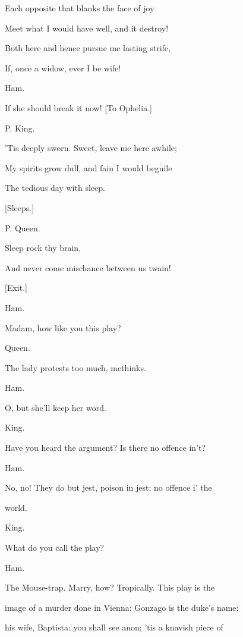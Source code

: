 \documentclass[12pt]{book}
\begin{document}
Each opposite that blanks the face of joy

Meet what I would have well, and it destroy!

Both here and hence pursue me lasting strife,

If, once a widow, ever I be wife!



Ham.

If she should break it now! [To Ophelia.]



P. King.

'Tis deeply sworn. Sweet, leave me here awhile;

My spirits grow dull, and fain I would beguile

The tedious day with sleep.

[Sleeps.]



P. Queen.

Sleep rock thy brain,

And never come mischance between us twain!



[Exit.]



Ham.

Madam, how like you this play?



Queen.

The lady protests too much, methinks.



Ham.

O, but she'll keep her word.



King.

Have you heard the argument? Is there no offence in't?



Ham.

No, no! They do but jest, poison in jest; no offence i' the

world.



King.

What do you call the play?



Ham.

The Mouse-trap. Marry, how? Tropically. This play is the

image of a murder done in Vienna: Gonzago is the duke's name;

his wife, Baptista: you shall see anon; 'tis a knavish piece of
\end{document}
